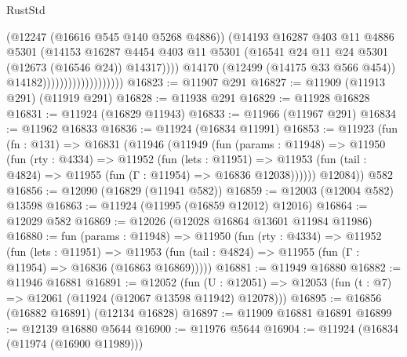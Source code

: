 \begin{lexlean}{RustStd}
\begin{coremodule}
{\begin{coremodule}
{{{{{{{{{{{{{{{{{{{{{{{{{{{{{{{{{{{{{{{{{{{{{{{{{{{{{{{{{{{{{{{{{{{{{{{{{{{{{{{{                                            (@12247 (@16616 @545 @140 @5268 @4886))
                                            (@14193
                                              @16287
                                              @403
                                              @11
                                              @4886
                                              @5301
                                              (@14153
                                                @16287
                                                @4454
                                                @403
                                                @11
                                                @5301
                                                (@16541
                                                  @24
                                                  @11
                                                  @24
                                                  @5301
                                                  (@12673 (@16546 @24))
                                                  @14317))))
                                          @14170
                                          (@12499 (@14175 @33 @566 @454))
                                          @14182)))))))))))))))))))
@16823 := @11907 @291
@16827 := @11909 (@11913 @291) (@11919 @291)
@16828 := @11938 @291
@16829 := @11928 @16828
@16831 := @11924 (@16829 @11943)
@16833 := @11966 (@11967 @291)
@16834 := @11962 @16833
@16836 := @11924 (@16834 @11991)
@16853 := @11923
    (fun (fn : @131) =>
    @16831
      (@11946
        (@11949
          (fun (params : @11948) =>
          @11950
            (fun (rty : @4334) =>
            @11952
              (fun (lets : @11951) =>
              @11953 (fun (tail : @4824) => @11955 (fun (Γ : @11954) => @16836 @12038))))))
        @12084))
    @582
@16856 := @12090 (@16829 (@11941 @582))
@16859 := @12003 (@12004 @582) @13598
@16863 := @11924 (@11995 (@16859 @12012) @12016)
@16864 := @12029 @582
@16869 := @12026 (@12028 @16864 @13601 @11984 @11986)
@16880 := fun (params : @11948) =>
  @11950
    (fun (rty : @4334) =>
    @11952
      (fun (lets : @11951) =>
      @11953 (fun (tail : @4824) => @11955 (fun (Γ : @11954) => @16836 (@16863 @16869)))))
@16881 := @11949 @16880
@16882 := @11946 @16881
@16891 := @12052
    (fun (U : @12051) => @12053 (fun (t : @7) => @12061 (@11924 (@12067 @13598 @11942) @12078)))
@16895 := @16856 (@16882 @16891) (@12134 @16828)
@16897 := @11909 @16881 @16891
@16899 := @12139 @16880 @5644
@16900 := @11976 @5644
@16904 := @11924 (@16834 (@11974 (@16900 @11989)))
}}}}}}}}}}}}}}}}}}}}}}}}}}}}}}}}}}}}}}}}}}}}}}}}}}}}}}}}}}}}}}}}}}}}}}}}}}}}}}}}
\end{coremodule}}
\end{coremodule}
\end{lexlean}
